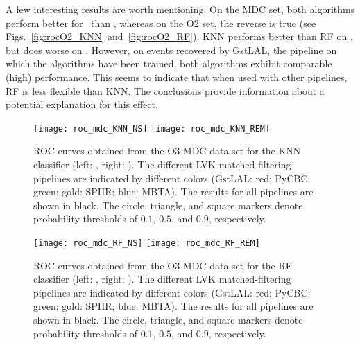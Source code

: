 A few interesting results are worth mentioning.  On the \ac{MDC} set, both algorithms perform better for \hasns\ than \hasrem, whereas on the \ac{O2} set, the reverse is true (see Figs.~\ref{fig:rocO2_KNN} and~\ref{fig:rocO2_RF}). \ac{KNN} performs better than \ac{RF} on \hasrem, but does worse on \hasns. However, on events recovered by GstLAL, the pipeline on which the algorithms have been trained, both algorithms exhibit comparable (high) performance. This seems to indicate that when used with other pipelines, \ac{RF} is less flexible than \ac{KNN}. The conclusions provide information about a potential explanation for this effect.
 

\begin{figure}%
\texttt{[image: roc\_mdc\_KNN\_NS]}
\texttt{[image: roc\_mdc\_KNN\_REM]}
\caption{\ac{ROC} curves obtained from the \ac{O3} \ac{MDC} data set for the \ac{KNN} classifier (left: \hasns, right: \hasrem). The different \ac{LVK} matched-filtering pipelines are indicated by different colors (GstLAL: red; PyCBC: green; gold: SPIIR; blue: MBTA). The results for all pipelines are shown in black. The circle, triangle, and square markers denote probability thresholds of $0.1$, $0.5$, and $0.9$, respectively.}
\label{fig:rocMDC_KNN}
\end{figure}


\begin{figure}%
\texttt{[image: roc\_mdc\_RF\_NS]}
\texttt{[image: roc\_mdc\_RF\_REM]}
\caption{\ac{ROC} curves obtained from the \ac{O3} \ac{MDC} data set for the \ac{RF} classifier (left: \hasns, right: \hasrem). The different \ac{LVK} matched-filtering pipelines are indicated by different colors (GstLAL: red; PyCBC: green; gold: SPIIR; blue: MBTA). The results for all pipelines are shown in black. The circle, triangle, and square markers denote probability thresholds of $0.1$, $0.5$, and $0.9$, respectively.}
\label{fig:rocMDC_RF}
\end{figure}

